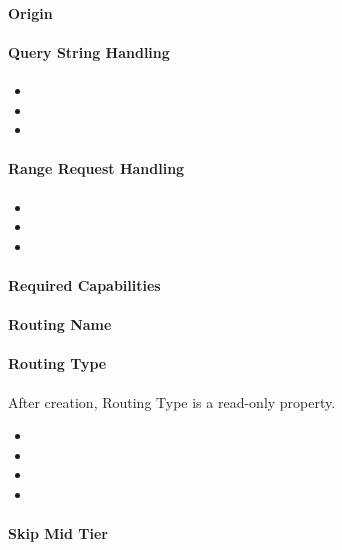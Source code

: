 \paragraph{Origin}

\paragraph{Query String Handling}

\begin{itemize}
	\item {}
	\item {}
	\item {}
\end{itemize}

\paragraph{Range Request Handling}
\begin{itemize}
	\item {}
	\item {}
	\item {}
\end{itemize}


\paragraph{Required Capabilities}

\paragraph{Routing Name}

\paragraph{Routing Type}
After creation, Routing Type is a read-only property.
\begin{itemize}
	\item {}
	\item {}
	\item {}
	\item {}
\end{itemize}

\paragraph{Skip Mid Tier}

